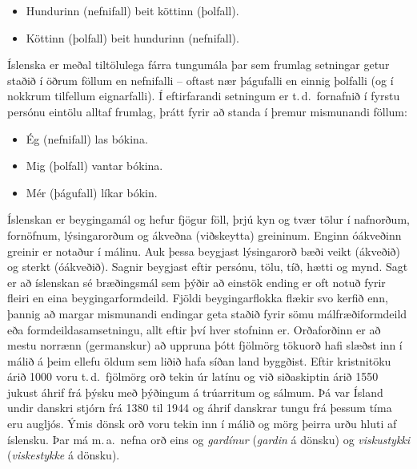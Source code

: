 \begin{multicols}{2}
\begin{itemize}
\item Hundurinn (nefnifall) beit köttinn (þolfall).
\item Köttinn (þolfall) beit hundurinn (nefnifall).
\end{itemize}

Íslenska er meðal tiltölulega fárra tungumála þar sem frumlag setningar getur staðið í öðrum föllum en nefnifalli -- oftast nær þágufalli en einnig þolfalli (og í nokkrum tilfellum eignarfalli). Í eftirfarandi setningum er t.\,d.~fornafnið í fyrstu persónu eintölu alltaf frumlag, þrátt fyrir að standa í þremur mismunandi föllum:

\begin{itemize}
\item Ég (nefnifall) las bókina.
\item Mig (þolfall) vantar bókina.
\item Mér (þágufall) líkar bókin.
\end{itemize}

Íslenskan er beygingamál og hefur fjögur föll, þrjú kyn og tvær tölur í nafnorðum, fornöfnum, lýsingarorðum og ákveðna (viðskeytta) greininum. Enginn óákveðinn greinir er notaður í málinu. Auk þessa beygjast lýsingarorð bæði veikt (ákveðið) og sterkt (óákveðið). Sagnir beygjast eftir persónu, tölu, tíð, hætti og mynd. Sagt er að íslenskan sé bræðingsmál sem þýðir að einstök ending er oft notuð fyrir fleiri en eina beygingarformdeild. Fjöldi beygingarflokka flækir svo kerfið enn, þannig að margar mismunandi endingar geta staðið fyrir sömu málfræðiformdeild eða formdeildasamsetningu, allt eftir því hver stofninn er.
Orðaforðinn er að mestu norrænn (germanskur) að uppruna þótt fjölmörg tökuorð hafi slæðst inn í málið á þeim ellefu öldum sem liðið hafa síðan land byggðist. Eftir kristnitöku árið 1000 voru t.\,d.~fjölmörg orð tekin úr latínu og við siðaskiptin árið 1550 jukust áhrif frá þýsku með þýðingum á trúarritum og sálmum. Þá var Ísland undir danskri stjórn frá 1380 til 1944 og áhrif danskrar tungu frá þessum tíma eru augljós. Ýmis dönsk orð voru tekin inn í málið og mörg þeirra urðu hluti af íslensku. Þar má m.\,a.~nefna orð eins og \textit{gardínur} (\textit{gardin} á dönsku) og \textit{viskustykki} (\textit{viskestykke} á dönsku).


\end{multicols}
